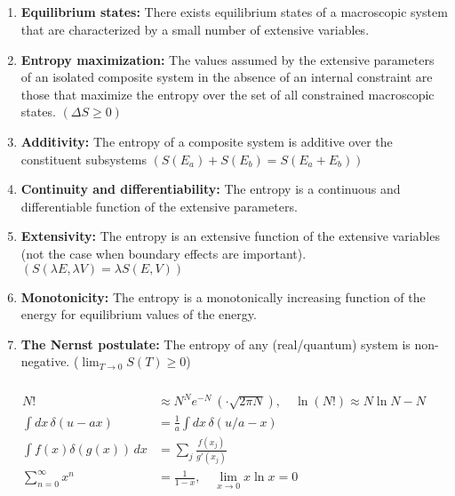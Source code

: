 \documentclass[a4paper, english, 12pt]{article}
\begin{document}
\tiny
\begin{multicols*}{2}


\subsection*{}

\begin{enumerate}
    \setlength\itemsep{0.05em}
    \item \textbf{Equilibrium states:} There exists equilibrium states of a macroscopic system that are characterized by a small number of extensive variables. 
    \item \textbf{Entropy maximization:} The values assumed by the extensive parameters of an isolated composite system in the absence of an internal constraint are those that maximize the entropy over the set of all constrained macroscopic states. $(\Delta S \geq 0)$
    \item \textbf{Additivity:} The entropy of a composite system is additive over the constituent subsystems $(S(E_a)+S(E_b) = S(E_a+E_b))$
    \item \textbf{Continuity and differentiability:} The entropy is a continuous and differentiable function of the extensive parameters. 
    \item \textbf{Extensivity:} The entropy is an extensive function of the extensive variables (not the case when boundary effects are important). $(S(\lambda E, \lambda V)=\lambda S(E,V))$
    \item \textbf{Monotonicity:} The entropy is a monotonically increasing function of the energy for equilibrium values of the energy. 
    \item \textbf{The Nernst postulate:} The entropy of any (real/quantum) system is non-negative. ($\lim_{T\to0} S(T)\geq0$)
\end{enumerate}


\subsubsection*{}
\begin{align*}
  N! & \approx N^N e^{-N}\:(\cdot \sqrt{2\pi N}),\quad  \ln{(N!)}  \approx N\ln{N}-N \\
  \int dx\,\delta(u-ax) &= \frac{1}{a}\int dx\,\delta(u/a - x) \\ 
  \int f(x)\delta(g(x))\,dx &= \sum_j \frac{f(x_j)}{g'(x_j)} \\
  \sum_{n=0}^\infty x^n &= \frac{1}{1-x},\quad \lim_{x\to0} x\ln x = 0
\end{align*}



\end{multicols*}
\end{document}
